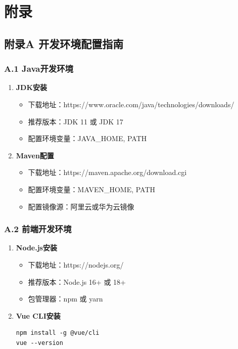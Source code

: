 
\chapter*{附\quad 录}

\section*{附录A 开发环境配置指南}

\subsection*{A.1 Java开发环境}

\begin{enumerate}
\item \textbf{JDK安装}
   \begin{itemize}
   \item 下载地址：https://www.oracle.com/java/technologies/downloads/
   \item 推荐版本：JDK 11 或 JDK 17
   \item 配置环境变量：JAVA\_HOME, PATH
   \end{itemize}

\item \textbf{Maven配置}
   \begin{itemize}
   \item 下载地址：https://maven.apache.org/download.cgi
   \item 配置环境变量：MAVEN\_HOME, PATH
   \item 配置镜像源：阿里云或华为云镜像
   \end{itemize}
\end{enumerate}

\subsection*{A.2 前端开发环境}

\begin{enumerate}
\item \textbf{Node.js安装}
   \begin{itemize}
   \item 下载地址：https://nodejs.org/
   \item 推荐版本：Node.js 16+ 或 18+
   \item 包管理器：npm 或 yarn
   \end{itemize}

\item \textbf{Vue CLI安装}
   \begin{lstlisting}[style=bash]
npm install -g @vue/cli
vue --version
   \end{lstlisting}
\end{enumerate}

